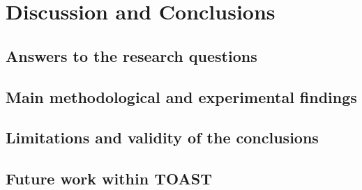 \chapter{Discussion and Conclusions}
\label{chap:conclusions}


\section{Answers to the research questions}
\label{sec:conclusions-questions}

\section{Main methodological and experimental findings}
\label{sec:conclusions-findings}

\section{Limitations and validity of the conclusions}
\label{sec:conclusions-limitations}

\section{Future work within TOAST}
\label{sec:conclusions-outlook}

